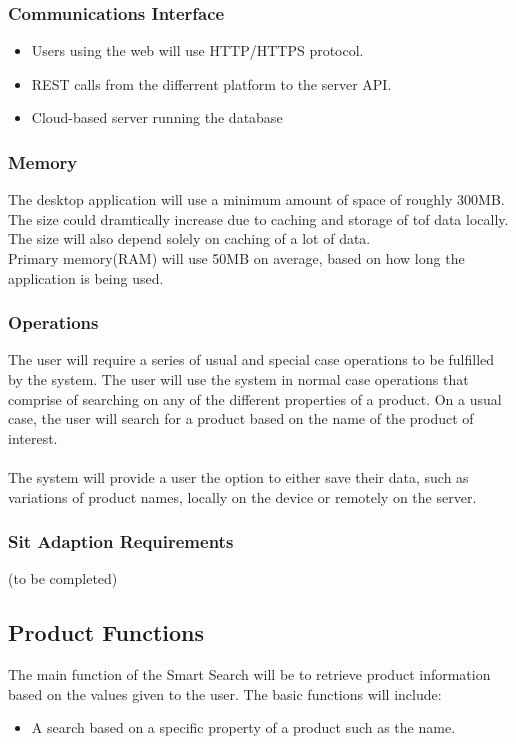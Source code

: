 \documentclass[a4paper,10pt]{article}
\begin{document}
	    \subsubsection{Communications Interface}
	 \begin{itemize}
	    \item Users using the web will use HTTP/HTTPS protocol.
	    \item REST calls from the differrent platform to the server API.
	    \item Cloud-based server running the database
	    \end{itemize}
            \subsubsection{Memory}
	    {The desktop application will use a minimum amount of space of roughly 300MB.  The size could dramtically increase due to caching and storage of tof data locally. The size will also depend solely on caching of a lot of data. \\
Primary memory(RAM) will use 50MB on average, based on how long the application is being used.}
            \subsubsection{Operations}

            	{The user will require a series of usual and special case operations to be fulfilled by the system. The user will use the system in normal case operations that comprise of searching on any of the different properties of a product. On a usual case, the user will search for a product based on the name of the product of interest.\\\\
            	The system will provide a user the option to either save their data, such as variations of product names, locally on the device or remotely on the server.}
           \subsubsection{Sit Adaption Requirements}
        (to be completed)
		\subsection{Product Functions} {The main function of the Smart Search will be to retrieve product information based on the values given to the user. The basic functions will include:  }
	\begin{itemize}
  		\item A search based on a specific property of a product such as the name.
	\end{itemize}
\end{document}
